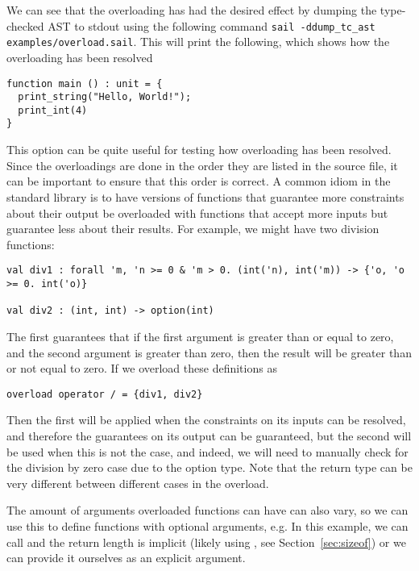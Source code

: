 

We can see that the overloading has had the desired effect by dumping
the type-checked AST to stdout using the following command
\verb+sail -ddump_tc_ast examples/overload.sail+. This will print the
following, which shows how the overloading has been resolved
\begin{lstlisting}
function main () : unit = {
  print_string("Hello, World!");
  print_int(4)
}
\end{lstlisting}
This option can be quite useful for testing how overloading has been
resolved. Since the overloadings are done in the order they are listed
in the source file, it can be important to ensure that this order is
correct. A common idiom in the standard library is to have versions of
functions that guarantee more constraints about their output be
overloaded with functions that accept more inputs but guarantee less
about their results. For example, we might have two division functions:
\begin{lstlisting}
val div1 : forall 'm, 'n >= 0 & 'm > 0. (int('n), int('m)) -> {'o, 'o >= 0. int('o)}

val div2 : (int, int) -> option(int)
\end{lstlisting}
The first guarantees that if the first argument is greater than or
equal to zero, and the second argument is greater than zero, then the
result will be greater than or not equal to zero. If we overload these
definitions as
\begin{lstlisting}
overload operator / = {div1, div2}
\end{lstlisting}
Then the first will be applied when the constraints on its inputs can
be resolved, and therefore the guarantees on its output can be
guaranteed, but the second will be used when this is not the case, and
indeed, we will need to manually check for the division by zero case
due to the option type. Note that the return type can be very
different between different cases in the overload.

The amount of arguments overloaded functions can have can also vary,
so we can use this to define functions with optional arguments, e.g.
 In this example, we can call
 and the return length is implicit (likely using
, see Section~\ref{sec:sizeof}) or we can provide it
ourselves as an explicit argument.


